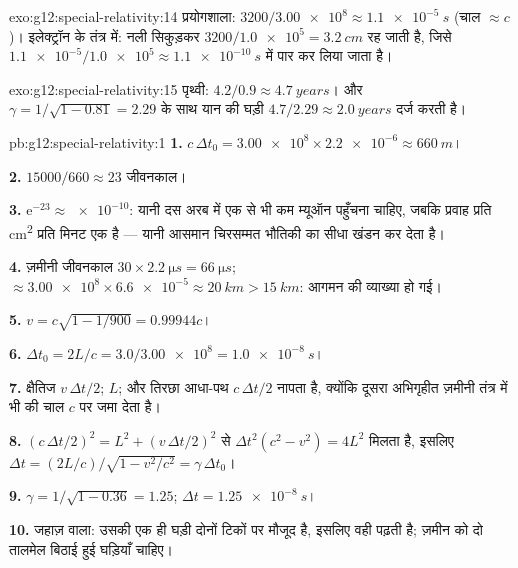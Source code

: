 \begin{solution}{exo:g12:special-relativity:14}
प्रयोगशाला: $3200/\num{3.00e8} \approx \qty{1.1e-5}{s}$ (चाल $\approx c$)। इलेक्ट्रॉन के तंत्र में: नली सिकुड़कर $3200/\num{1.0e5} = \qty{3.2}{cm}$
रह जाती है, जिसे $\num{1.1e-5}/\num{1.0e5} \approx \qty{1.1e-10}{s}$ में पार कर लिया जाता है।
\end{solution}

\begin{solution}{exo:g12:special-relativity:15}
पृथ्वी: $4.2/0.9 \approx \qty{4.7}{years}$। और $\gamma = 1/\sqrt{1 - 0.81} = 2.29$ के साथ यान की घड़ी $4.7/2.29 \approx \qty{2.0}{years}$ दर्ज करती है।
\end{solution}

\begin{solution}{pb:g12:special-relativity:1}
\textbf{1.} $c\,\Delta t_0 = \num{3.00e8} \times \num{2.2e-6} \approx
\qty{660}{m}$।

\textbf{2.} $\num{15000}/660 \approx 23$ जीवनकाल।

\textbf{3.} $\mathrm{e}^{-23} \approx \num{e-10}$: यानी दस अरब में एक से भी कम म्यूऑन पहुँचना चाहिए, जबकि
प्रवाह प्रति \unit{cm^2} प्रति मिनट एक है --- यानी आसमान चिरसम्मत भौतिकी का सीधा
खंडन कर देता है।

\textbf{4.} ज़मीनी जीवनकाल $30 \times \qty{2.2}{\micro s} =
\qty{66}{\micro s}$;  $\approx \num{3.00e8} \times \num{6.6e-5}
\approx \qty{20}{km} > \qty{15}{km}$: आगमन की व्याख्या हो गई।

\textbf{5.} $v = c\sqrt{1 - 1/900} = 0.99944c$।

\textbf{6.} $\Delta t_0 = 2L/c = 3.0/\num{3.00e8} = \qty{1.0e-8}{s}$।

\textbf{7.} क्षैतिज $v\,\Delta t/2$;  $L$; और तिरछा आधा-पथ $c\,\Delta t/2$ नापता है,
क्योंकि दूसरा अभिगृहीत ज़मीनी तंत्र में भी  की चाल $c$
पर जमा देता है।

\textbf{8.} $(c\,\Delta t/2)^2 = L^2 + (v\,\Delta t/2)^2$ से $\Delta t^2(c^2 - v^2) = 4L^2$ मिलता है, इसलिए $\Delta t =
(2L/c)/\sqrt{1 - v^2/c^2} = \gamma\,\Delta t_0$।

\textbf{9.} $\gamma = 1/\sqrt{1 - 0.36} = 1.25$; $\Delta t = \qty{1.25e-8}{s}$।

\textbf{10.} जहाज़ वाला: उसकी एक ही घड़ी दोनों टिकों पर मौजूद है, इसलिए वही
 पढ़ती है; ज़मीन को दो तालमेल बिठाई हुई घड़ियाँ चाहिए।


\end{solution}
